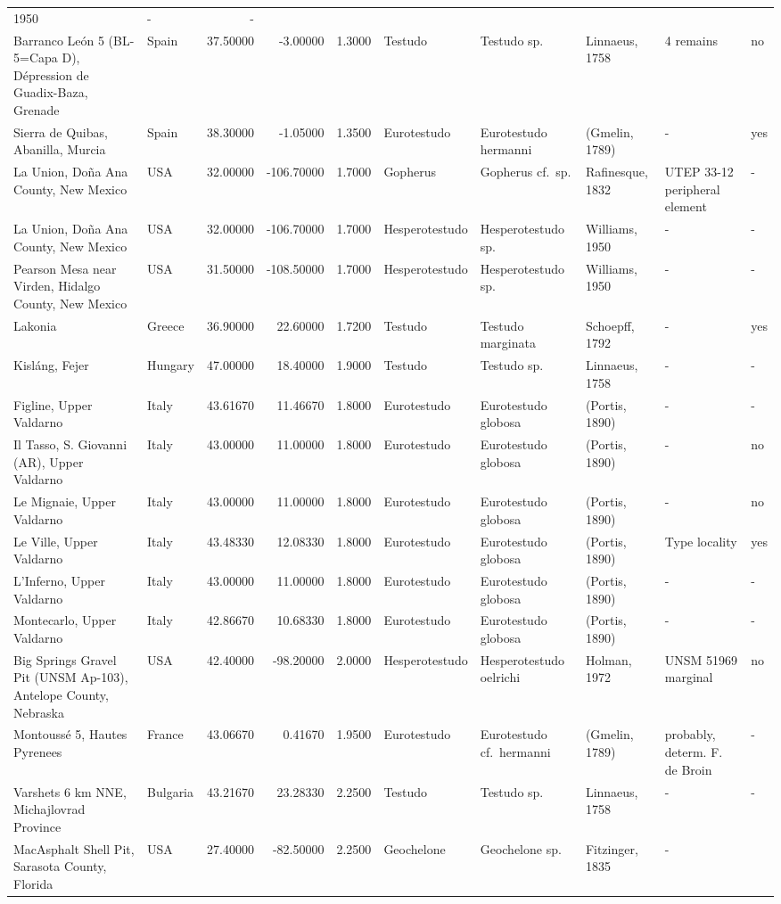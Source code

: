 \documentclass[]{article}
\begin{document}
\begin{longtable}[]{@{}llrrrlllll@{}}
1950 & - & -\tabularnewline
Barranco León 5 (BL-5=Capa D), Dépression de Guadix-Baza, Grenade &
Spain & 37.50000 & -3.00000 & 1.3000 & Testudo & Testudo sp. & Linnaeus,
1758 & 4 remains & no\tabularnewline
Sierra de Quibas, Abanilla, Murcia & Spain & 38.30000 & -1.05000 &
1.3500 & Eurotestudo & Eurotestudo hermanni & (Gmelin, 1789) & - &
yes\tabularnewline
La Union, Doña Ana County, New Mexico & USA & 32.00000 & -106.70000 &
1.7000 & Gopherus & Gopherus cf.~sp. & Rafinesque, 1832 & UTEP 33-12
peripheral element & -\tabularnewline
La Union, Doña Ana County, New Mexico & USA & 32.00000 & -106.70000 &
1.7000 & Hesperotestudo & Hesperotestudo sp. & Williams, 1950 & - &
-\tabularnewline
Pearson Mesa near Virden, Hidalgo County, New Mexico & USA & 31.50000 &
-108.50000 & 1.7000 & Hesperotestudo & Hesperotestudo sp. & Williams,
1950 & - & -\tabularnewline
Lakonia & Greece & 36.90000 & 22.60000 & 1.7200 & Testudo & Testudo
marginata & Schoepff, 1792 & - & yes\tabularnewline
Kisláng, Fejer & Hungary & 47.00000 & 18.40000 & 1.9000 & Testudo &
Testudo sp. & Linnaeus, 1758 & - & -\tabularnewline
Figline, Upper Valdarno & Italy & 43.61670 & 11.46670 & 1.8000 &
Eurotestudo & Eurotestudo globosa & (Portis, 1890) & - &
-\tabularnewline
Il Tasso, S. Giovanni (AR), Upper Valdarno & Italy & 43.00000 & 11.00000
& 1.8000 & Eurotestudo & Eurotestudo globosa & (Portis, 1890) & - &
no\tabularnewline
Le Mignaie, Upper Valdarno & Italy & 43.00000 & 11.00000 & 1.8000 &
Eurotestudo & Eurotestudo globosa & (Portis, 1890) & - &
no\tabularnewline
Le Ville, Upper Valdarno & Italy & 43.48330 & 12.08330 & 1.8000 &
Eurotestudo & Eurotestudo globosa & (Portis, 1890) & Type locality &
yes\tabularnewline
L'Inferno, Upper Valdarno & Italy & 43.00000 & 11.00000 & 1.8000 &
Eurotestudo & Eurotestudo globosa & (Portis, 1890) & - &
-\tabularnewline
Montecarlo, Upper Valdarno & Italy & 42.86670 & 10.68330 & 1.8000 &
Eurotestudo & Eurotestudo globosa & (Portis, 1890) & - &
-\tabularnewline
Big Springs Gravel Pit (UNSM Ap-103), Antelope County, Nebraska & USA &
42.40000 & -98.20000 & 2.0000 & Hesperotestudo & Hesperotestudo oelrichi
& Holman, 1972 & UNSM 51969 marginal & no\tabularnewline
Montoussé 5, Hautes Pyrenees & France & 43.06670 & 0.41670 & 1.9500 &
Eurotestudo & Eurotestudo cf.~hermanni & (Gmelin, 1789) & probably,
determ. F. de Broin & -\tabularnewline
Varshets 6 km NNE, Michajlovrad Province & Bulgaria & 43.21670 &
23.28330 & 2.2500 & Testudo & Testudo sp. & Linnaeus, 1758 & - &
-\tabularnewline
MacAsphalt Shell Pit, Sarasota County, Florida & USA & 27.40000 &
-82.50000 & 2.2500 & Geochelone & Geochelone sp. & Fitzinger, 1835 & - &

\end{longtable}
\end{document}
